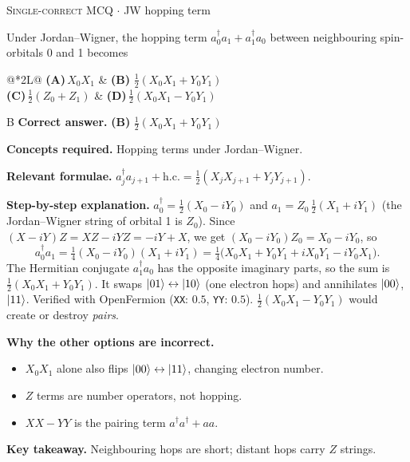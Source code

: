 \documentclass[11pt,a4paper]{article}
\newcommand{\optlabel}[1]{\textbf{(#1)}}
\newcommand{\correctlabel}[1]{\textcolor{okgreen}{\textbf{(#1)}\,\ding{51}}}
\newenvironment{qitem}[1]{\begin{list}{}{\setlength{\leftmargin}{3.3em}\setlength{\labelwidth}{3.1em}%
  \setlength{\labelsep}{0.2em}\setlength{\topsep}{3pt}\setlength{\parsep}{3pt}}\item[\textbf{Q.#1}\hfill]}{\end{list}}
\newcommand{\qsep}{\par\vspace{2pt}{\color{black!15}\hrule}\vspace{4pt}}
\newcommand{\qmeta}[2]{{\footnotesize\color{black!60}\textsc{#1} \;$\cdot$\; #2}\par}
\begin{document}
\begin{qitem}{62}
\qmeta{Single-correct MCQ}{JW hopping term}
Under Jordan--Wigner, the hopping term $a_0^\dagger a_1 + a_1^\dagger a_0$ between neighbouring spin-orbitals 0 and 1 becomes
\par\smallskip\noindent\begin{tabularx}{\linewidth}{@{}*{2}{L}@{}}
\optlabel{A}\,$X_0X_1$ & \correctlabel{B}\,$\tfrac12(X_0X_1 + Y_0Y_1)$ \\[3pt]
\optlabel{C}\,$\tfrac12(Z_0 + Z_1)$ & \optlabel{D}\,$\tfrac12(X_0X_1 - Y_0Y_1)$
\end{tabularx}
\end{qitem}
\begin{solbox}{B}
\textbf{\color{brand}Correct answer.} \textcolor{okgreen}{\textbf{(B)}} $\tfrac12(X_0X_1 + Y_0Y_1)$

\textbf{\color{brand}Concepts required.} Hopping terms under Jordan--Wigner.

\textbf{\color{brand}Relevant formulae.} $a_j^\dagger a_{j+1} + \text{h.c.} = \tfrac12(X_jX_{j+1} + Y_jY_{j+1})$.

\textbf{\color{brand}Step-by-step explanation.} $a_0^\dagger = \tfrac12(X_0 - iY_0)$ and $a_1 = Z_0\,\tfrac12(X_1 + iY_1)$ (the Jordan--Wigner string of orbital 1 is $Z_0$). Since
$(X - iY)Z = XZ - iYZ = -iY + X$, we get $(X_0 - iY_0)Z_0 = X_0 - iY_0$, so
\[ a_0^\dagger a_1 = \tfrac14(X_0 - iY_0)(X_1 + iY_1) = \tfrac14\big(X_0X_1 + Y_0Y_1 + iX_0Y_1 - iY_0X_1\big). \]
The Hermitian conjugate $a_1^\dagger a_0$ has the opposite imaginary parts, so the sum is $\tfrac12(X_0X_1 + Y_0Y_1)$. It swaps $\ket{01} \leftrightarrow \ket{10}$ (one electron
hops) and annihilates $\ket{00}$, $\ket{11}$. Verified with OpenFermion (\texttt{XX}: $0.5$, \texttt{YY}: $0.5$). $\tfrac12(X_0X_1 - Y_0Y_1)$ would create or destroy \emph{pairs}.

\textbf{\color{brand}Why the other options are incorrect.}
\begin{itemize}[leftmargin=2.4em, itemsep=1pt, topsep=2pt]
\item[\textbf{(A)}] $X_0X_1$ alone also flips $\ket{00} \leftrightarrow \ket{11}$, changing electron number.
\item[\textbf{(C)}] $Z$ terms are number operators, not hopping.
\item[\textbf{(D)}] $XX - YY$ is the pairing term $a^\dagger a^\dagger + aa$.
\end{itemize}
\textbf{\color{brand}Key takeaway.} Neighbouring hops are short; distant hops carry $Z$ strings.
\end{solbox}
\qsep
\end{document}
